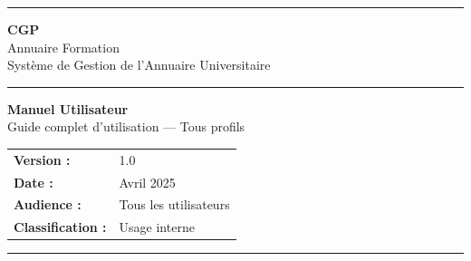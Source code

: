 \documentclass[12pt,a4paper,openany]{report}
\begin{document}
\begin{titlepage}
\centering
\vspace*{1.5cm}

{\color{cgpblue}\rule{\linewidth}{3pt}}
\vspace{0.6cm}

\begin{tcolorbox}[
  enhanced, width=0.8\textwidth,
  colback=cgplightblue, colframe=cgpblue,
  boxrule=2pt, arc=8pt,
  left=12pt, right=12pt, top=14pt, bottom=14pt
]
  \centering
  {\color{cgpblue}\fontsize{48}{52}\selectfont\bfseries CGP}\\[0.4cm]
  {\color{cgpgray}\Large Annuaire Formation}\\[0.2cm]
  {\color{cgpgray}\normalsize Syst\`eme de Gestion de l'Annuaire Universitaire}
\end{tcolorbox}

\vspace{0.8cm}
{\color{cgpblue}\rule{0.5\linewidth}{1.5pt}}
\vspace{0.7cm}

{\fontsize{32}{36}\selectfont\bfseries\color{cgpblue} Manuel Utilisateur}\\[0.4cm]
{\Large\color{cgpgray} Guide complet d'utilisation --- Tous profils}

\vspace{1cm}

\begin{tcolorbox}[
  enhanced, width=0.55\textwidth,
  colback=cgplightgray, colframe=cgpgray!40,
  boxrule=0.5pt, arc=4pt,
  left=10pt, right=10pt, top=8pt, bottom=8pt
]
\centering\small
\begin{tabular}{@{}ll@{}}
  \textbf{Version :}        & 1.0 \\[4pt]
  \textbf{Date :}           & Avril 2025 \\[4pt]
  \textbf{Audience :}       & Tous les utilisateurs \\[4pt]
  \textbf{Classification :} & Usage interne \\[4pt]
\end{tabular}
\end{tcolorbox}

\vfill
{\color{cgpblue}\rule{\linewidth}{3pt}}
\end{titlepage}

\end{document}
